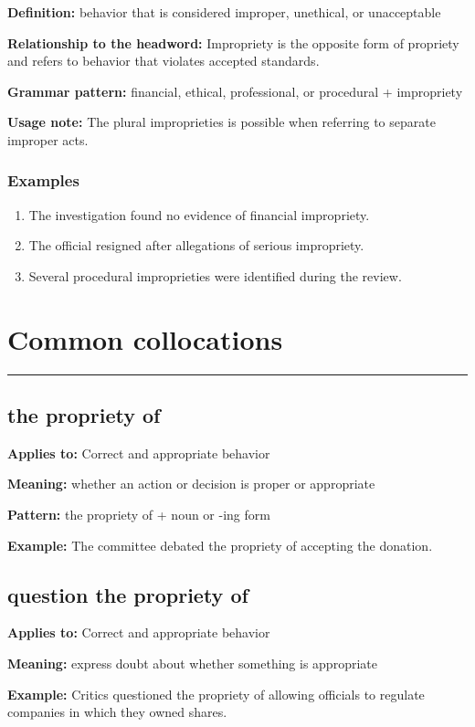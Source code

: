 \documentclass[11pt]{article}
\newcommand{\sectionrule}{\par\vspace{-0.5em}\noindent\textcolor{Accent}{\rule{\linewidth}{0.6pt}}\par}
\begin{document}
\textbf{Definition:} behavior that is considered improper, unethical, or unacceptable

\textbf{Relationship to the headword:} Impropriety is the opposite form of propriety and refers to behavior that violates accepted standards.

\textbf{Grammar pattern:} financial, ethical, professional, or procedural + impropriety

\textbf{Usage note:} The plural improprieties is possible when referring to separate improper acts.

\subsubsection{Examples}
\begin{enumerate}
  \item The investigation found no evidence of financial impropriety.
  \item The official resigned after allegations of serious impropriety.
  \item Several procedural improprieties were identified during the review.
\end{enumerate}

\section{Common collocations}
\sectionrule
\subsection{the propriety of}
\textbf{Applies to:} Correct and appropriate behavior

\textbf{Meaning:} whether an action or decision is proper or appropriate

\textbf{Pattern:} the propriety of + noun or -ing form

\textbf{Example:} The committee debated the propriety of accepting the donation.

\subsection{question the propriety of}
\textbf{Applies to:} Correct and appropriate behavior

\textbf{Meaning:} express doubt about whether something is appropriate

\textbf{Example:} Critics questioned the propriety of allowing officials to regulate companies in which they owned shares.
\end{document}
